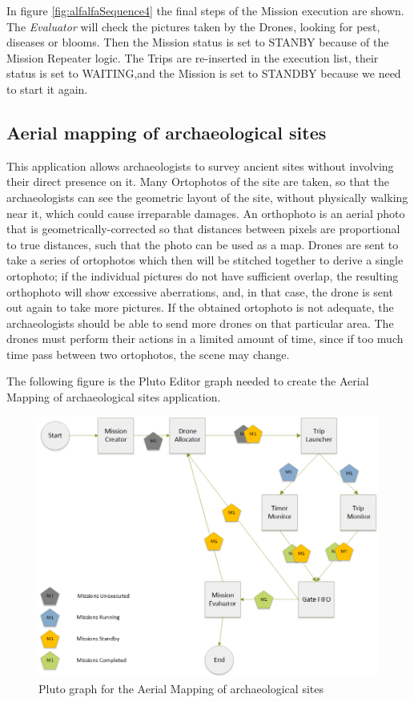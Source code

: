 In figure \ref{fig:alfalfaSequence4} the final steps of the Mission execution are shown.
The \textit{Evaluator} will check the pictures taken by the Drones, looking for pest, diseases or blooms.
Then the Mission status is set to STANBY because of the Mission Repeater logic.
The Trips are re-inserted in the execution list, their status is set to WAITING,and the Mission is set to STANDBY because we need to start it again.
\\

\subsection{Aerial mapping of archaeological sites}\label{aerialMapping}

This application allows archaeologists to survey ancient sites without involving their direct presence on it.
Many Ortophotos of the site are taken, so that the archaeologists can see the geometric layout of the site, without physically walking near it, which could cause irreparable damages.
An orthophoto is an aerial photo that is geometrically-corrected so that distances between pixels are proportional to true distances, such that the photo can be used as a map.
Drones are sent to take a series of ortophotos which then will be stitched together to derive a single ortophoto; if the individual pictures do not have sufficient overlap, the resulting orthophoto will show excessive aberrations, and, in that case, the drone is sent out again to take more pictures.
If the obtained ortophoto is not adequate, the archaeologists should be able to send more drones on that particular area.
The drones must perform their actions in a limited amount of time, since if too much time pass between two ortophotos, the scene may change.

The following figure is the Pluto Editor graph needed to create the Aerial Mapping of archaeological sites application. 

\begin{figure}[H]
  \centering
  \includegraphics[width=\linewidth]{pictures/Putti_Diagram.png}
  \caption{Pluto graph for the Aerial Mapping of archaeological sites}
  \label{fig:puttiGraph}
\end{figure}

